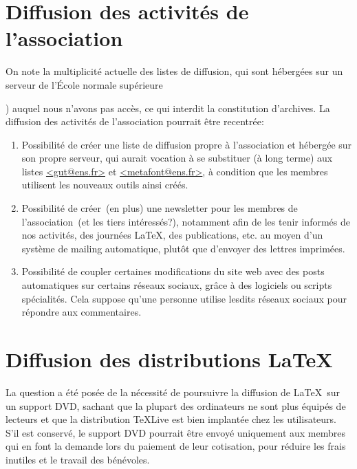 \documentclass{tufte-handout}
\newcommand{\ratio}[3][]{\marginpar{\footnotesize{\textcolor{teal}{Temps requis: #2 / Utilité: #3}\par\noindent \textcolor{teal}{#1}}}}
\begin{document}
\section{Diffusion des activités de l'association}

On note la multiplicité actuelle des listes de diffusion, qui sont hébergées sur un serveur de l'École normale supérieure~{) auquel nous n'avons pas accès, ce qui interdit la constitution d'archives. La diffusion des activités de l'association pourrait être recentrée:

\begin{enumerate}
	\item Possibilité de créer\ratio[Simple, mais \emph{quid} de l'efficacité]{+}{+} une liste de diffusion propre à l'association et hébergée sur son propre serveur, qui aurait vocation à se substituer (à long terme) aux listes \url{<gut@ens.fr>} et \url{<metafont@ens.fr>}, à condition que les membres utilisent les nouveaux outils ainsi créés.
	\item Possibilité de créer~(en plus) une newsletter\ratio[Simple et utile pour toucher davantage d'utilisateurs]{+}{++} pour les membres de l'association~(et les tiers intéressés?), notamment afin de les tenir informés de nos activités, des journées \LaTeX, des publications, etc. au moyen d'un système de mailing automatique, plutôt que d'envoyer des lettres imprimées.
	\item Possibilité de coupler certaines modifications\ratio[Atteindre de nouveaux publics, mais ces médias correspondent-ils à notre philosophie?]{++}{+} du site web avec des posts automatiques sur certains réseaux sociaux, grâce à des logiciels ou scripts spécialités. Cela suppose qu'une personne utilise lesdits réseaux sociaux pour répondre aux commentaires.
\end{enumerate}


\section{Diffusion des distributions \LaTeX}

La question a été posée\ratio[Relativement chronophage et coûteux]{++}{+} de la nécessité de poursuivre la diffusion de \LaTeX\ sur un support DVD, sachant que la plupart des ordinateurs ne sont plus équipés de lecteurs et que la distribution \TeX Live est bien implantée chez les utilisateurs. S'il est conservé, le support DVD pourrait être envoyé uniquement aux membres qui en font la demande lors du paiement de leur cotisation, pour réduire les frais inutiles et le travail des bénévoles.


}
\end{document}
